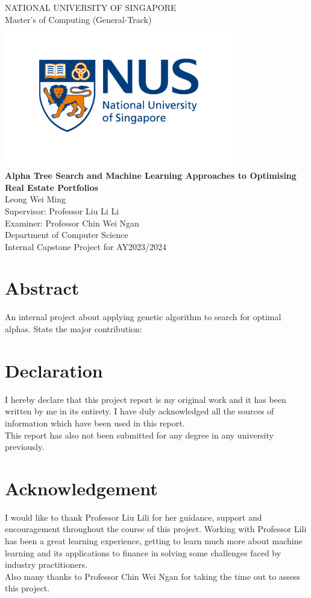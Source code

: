 \documentclass[a4paper,12pt]{report}
\numberwithin{equation}{section}
\theoremstyle{definition}
\begin{document}
\begin{center}


\Large NATIONAL UNIVERSITY OF SINGAPORE\\ 
\Large Master's of Computing (General-Track) \\ [0.2in]
\includegraphics[width=10cm]{1.nus_logo_full-horizontal} \\
\Large {\bf Alpha Tree Search and Machine Learning Approaches to Optimising Real Estate Portfolios}\\ [0.2in]
Leong Wei Ming \\
Supervisor: Professor Liu Li Li \\
Examiner: Professor Chin Wei Ngan \\ [0.3in]
Department of Computer Science \\
Internal Capstone Project for AY2023/2024
\end{center}


\chapter*{Abstract}
An internal project about applying genetic algorithm to search for optimal alphas.    
State the major contribution:

\chapter*{Declaration}
\begin{center}{\large
I hereby declare that this project report is my original work and it has been written by me in its entirety. I have duly acknowledged all the sources of information which have been used in this report. \\[0.5in]
This report has also not been submitted for any degree in any university previously.
}

\chapter*{Acknowledgement}
{\large
I would like to thank Professor Liu Lili for her guidance, support and encouragement throughout the course of this project. Working with Professor Lili has been a great learning experience, getting to learn much more about machine learning and its applications to finance in solving some challenges faced by industry practitioners. \\[0.5in]
Also many thanks to Professor Chin Wei Ngan for taking the time out to assess this project.

}
\end{center}
\setcounter{secnumdepth}{3}
\setcounter{tocdepth}{3}
\end{document}
